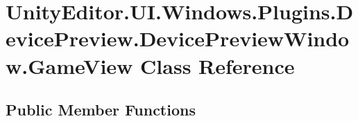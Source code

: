 \hypertarget{class_unity_editor_1_1_u_i_1_1_windows_1_1_plugins_1_1_device_preview_1_1_device_preview_window_1_1_game_view}{}\section{Unity\+Editor.\+U\+I.\+Windows.\+Plugins.\+Device\+Preview.\+Device\+Preview\+Window.\+Game\+View Class Reference}
\label{class_unity_editor_1_1_u_i_1_1_windows_1_1_plugins_1_1_device_preview_1_1_device_preview_window_1_1_game_view}
\subsection*{Public Member Functions}
